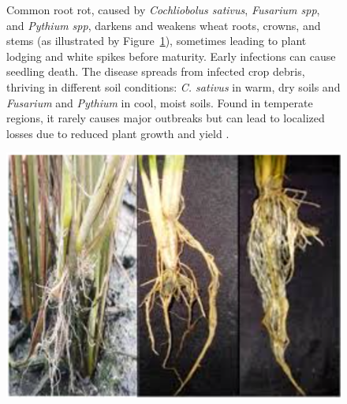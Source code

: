 \begin{figure}[H]
    \centering
    \begin{minipage}{0.65\textwidth}
        
        Common root rot, caused by \textit{Cochliobolus sativus}, \textit{Fusarium spp}, and \textit{Pythium spp}, darkens and weakens wheat roots, crowns, and stems (as illustrated by Figure~\ref{fig:Figure10}), sometimes leading to plant lodging and white spikes before maturity. Early infections can cause seedling death.
        The disease spreads from infected crop debris, thriving in different soil conditions: \textit{C. sativus} in warm, dry soils and \textit{Fusarium} and \textit{Pythium} in cool, moist soils. Found in temperate regions, it rarely causes major outbreaks but can lead to localized losses due to reduced plant growth and yield \parencite{duveiller2012wheat}.
    \end{minipage}%
    \hfill
    \begin{minipage}{0.3\textwidth}
        \centering
        \includegraphics[width=0.8\linewidth]{chapters/chapter2/images/Figure10.png}
        \label{fig:Figure10}
    \end{minipage}
\end{figure}



